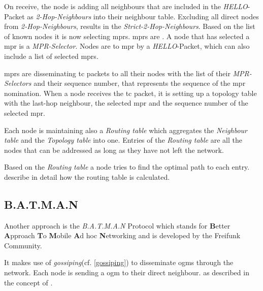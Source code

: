 On receive, the node is adding all neighbours that are included in the \textit{HELLO}-Packet as \textit{2-Hop-Neighbours} into their neighbour table. Excluding all direct nodes from \textit{2-Hop-Neighbours}, results in the \textit{Strict-2-Hop-Neighbours}.
Based on the list of known nodes it is now selecting \glspl{mpr}. \Glspl{mpr} are \cite[\S1.4]{rfc-oslr}. A node that has selected a \gls{mpr} is a \textit{MPR-Selector}. Nodes are  to \gls{mpr} by a \textit{HELLO}-Packet, which can also include a list of selected \glspl{mpr}.

\Glspl{mpr} are disseminating \gls{tc} packets to all their nodes with the list of their \textit{MPR-Selectors} and their sequence number, that represents the sequence of the \gls{mpr} nomination.
When a node receives the \gls{tc} packet, it is setting up a topology table with the last-hop neighbour, the selected \gls{mpr} and the sequence number of the selected \gls{mpr}.

Each node is maintaining also a \textit{Routing table} which aggregates the \textit{Neighbour table} and the \textit{Topology table} into one. Entries of the \textit{Routing table} are all the nodes that can be addressed as long as they have not left the network. 

Based on the \textit{Routing table} a node tries to find the optimal path to each entry. \citet[\S4.4]{jacquet_muhlethaler_clausen_laouiti_qayyum_viennot} describe in detail how the routing table is calculated.

\subsection{B.A.T.M.A.N}\label{sec:batman}
Another approach is the \textit{B.A.T.M.A.N} Protocol which stands for \textbf{B}etter \textbf{A}pproach \textbf{T}o \textbf{M}obile \textbf{A}d hoc \textbf{N}etworking and is developed by the Freifunk Community.

It makes use of \textit{gossiping}(cf. \vref{gossiping}) to disseminate \glspl{ogm} through the network. Each node is sending a \gls{ogm} to their direct neighbour.  as described in the concept of \citet{batman}.

